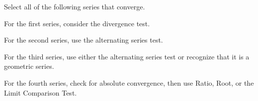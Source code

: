 \documentclass{ximera}
\author{Jim Talamo}
\begin{document}
\begin{exercise}

Select all of the following series that converge.

\begin{selectAll}
\end{selectAll}

\begin{hint}
For the first series, consider the divergence test.

For the second series, use the alternating series test.

For the third series, use either the alternating series test or recognize that it is a geometric series.

For the fourth series, check for absolute convergence, then use Ratio, Root, or the Limit Comparison Test.
\end{hint}

\end{exercise}
\end{document}
